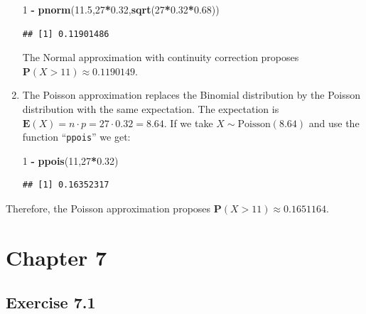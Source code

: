 \documentclass[]{krantz}
\makeatletter
\newenvironment{Shaded}{\begin{snugshade}}{\end{snugshade}}
\newcommand{\DecValTok}[1]{\textcolor[rgb]{0.00,0.00,0.81}{#1}}
\newcommand{\FloatTok}[1]{\textcolor[rgb]{0.00,0.00,0.81}{#1}}
\newcommand{\KeywordTok}[1]{\textcolor[rgb]{0.13,0.29,0.53}{\textbf{#1}}}
\newcommand{\NormalTok}[1]{#1}
\newcommand{\OperatorTok}[1]{\textcolor[rgb]{0.81,0.36,0.00}{\textbf{#1}}}
\newcommand{\StringTok}[1]{\textcolor[rgb]{0.31,0.60,0.02}{#1}}
\newcommand{\Expec}{\mathbf{E}}
\newcommand{\Prob}{\mathbf{P}}
\newenvironment{kframe}{%
\medskip{}
\setlength{\fboxsep}{.8em}
 \def\at@end@of@kframe{}%
 \ifinner\ifhmode%
  \def\at@end@of@kframe{\end{minipage}}%
  \begin{minipage}{\columnwidth}%
 \fi\fi%
 \def\FrameCommand##1{\hskip\@totalleftmargin \hskip-\fboxsep
 \colorbox{shadecolor}{##1}\hskip-\fboxsep
     \hskip-\linewidth \hskip-\@totalleftmargin \hskip\columnwidth}%
 \MakeFramed {\advance\hsize-\width
   \@totalleftmargin\z@ \linewidth\hsize
   \@setminipage}}%
 {\par\unskip\endMakeFramed%
 \at@end@of@kframe}
\renewenvironment{Shaded}{\begin{kframe}}{\end{kframe}}
\theoremstyle{definition}
\theoremstyle{definition}
\theoremstyle{definition}
\theoremstyle{remark}
\makeatother
\begin{document}
\begin{enumerate}
\begin{Shaded}
\begin{Highlighting}[]
\DecValTok{1} \OperatorTok{-}\StringTok{ }\KeywordTok{pnorm}\NormalTok{(}\FloatTok{11.5}\NormalTok{,}\DecValTok{27}\OperatorTok{*}\FloatTok{0.32}\NormalTok{,}\KeywordTok{sqrt}\NormalTok{(}\DecValTok{27}\OperatorTok{*}\FloatTok{0.32}\OperatorTok{*}\FloatTok{0.68}\NormalTok{))}
\end{Highlighting}
\end{Shaded}

\begin{verbatim}
## [1] 0.11901486
\end{verbatim}

  The Normal approximation with continuity correction proposes
  \(\Prob(X > 11) \approx 0.1190149\).
\item
  The Poisson approximation replaces the
  Binomial distribution by the Poisson distribution with the same
  expectation. The expectation is
  \(\Expec(X) = n \cdot p = 27 \cdot 0.32 = 8.64\). If we take
  \(X \sim \mbox{Poisson}(8.64)\) and use the function ``\texttt{ppois}'' we get:

\begin{Shaded}
\begin{Highlighting}[]
\DecValTok{1} \OperatorTok{-}\StringTok{ }\KeywordTok{ppois}\NormalTok{(}\DecValTok{11}\NormalTok{,}\DecValTok{27}\OperatorTok{*}\FloatTok{0.32}\NormalTok{)}
\end{Highlighting}
\end{Shaded}

\begin{verbatim}
## [1] 0.16352317
\end{verbatim}
\end{enumerate}

Therefore, the Poisson approximation proposes
\(\Prob(X > 11) \approx 0.1651164\).

\hypertarget{chapter-7}{%
\section*{Chapter 7}\label{chapter-7}}


\hypertarget{exercise-7.1}{%
\subsection*{Exercise 7.1}\label{exercise-7.1}}
\end{document}
